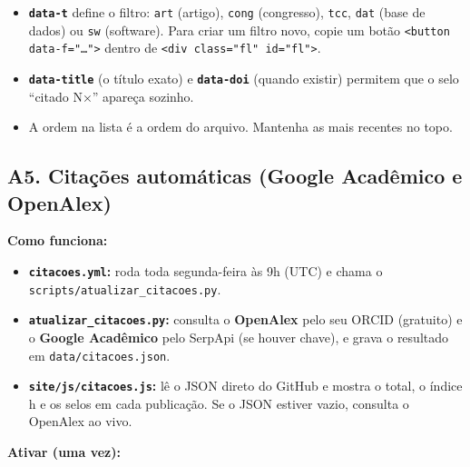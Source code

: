 \documentclass[
  10pt,
]{article}
\providecommand{\tightlist}{%
  \setlength{\itemsep}{0pt}\setlength{\parskip}{0pt}}
\begin{document}
\begin{itemize}
\tightlist
\item
  \textbf{\texttt{data-\allowbreak{}t}} define o filtro: \texttt{art}
  (artigo), \texttt{cong} (congresso), \texttt{tcc}, \texttt{dat} (base
  de dados) ou \texttt{sw} (software). Para criar um filtro novo, copie
  um botão \texttt{<button data-\allowbreak{}f="…">} dentro de
  \texttt{<div class="fl" id="fl">}.
\item
  \textbf{\texttt{data-\allowbreak{}title}} (o título exato) e
  \textbf{\texttt{data-\allowbreak{}doi}} (quando existir) permitem que
  o selo ``citado N×'' apareça sozinho.
\item
  A ordem na lista é a ordem do arquivo. Mantenha as mais recentes no
  topo.
\end{itemize}

\hypertarget{a5.-citauxe7uxf5es-automuxe1ticas-google-acaduxeamico-e-openalex}{%
\subsection{A5. Citações automáticas (Google Acadêmico e
OpenAlex)}\label{a5.-citauxe7uxf5es-automuxe1ticas-google-acaduxeamico-e-openalex}}

\textbf{Como funciona:}

\begin{itemize}
\tightlist
\item
  \textbf{\texttt{citacoes.\allowbreak{}yml}:} roda toda segunda-feira
  às 9h (UTC) e chama o
  \texttt{scripts/\allowbreak{}atualizar\_\allowbreak{}citacoes.\allowbreak{}py}.
\item
  \textbf{\texttt{atualizar\_\allowbreak{}citacoes.\allowbreak{}py}:}
  consulta o \textbf{OpenAlex} pelo seu ORCID (gratuito) e o
  \textbf{Google Acadêmico} pelo SerpApi (se houver chave), e grava o
  resultado em \texttt{data/\allowbreak{}citacoes.\allowbreak{}json}.
\item
  \textbf{\texttt{site/\allowbreak{}js/\allowbreak{}citacoes.\allowbreak{}js}:}
  lê o JSON direto do GitHub e mostra o total, o índice h e os selos em
  cada publicação. Se o JSON estiver vazio, consulta o OpenAlex ao vivo.
\end{itemize}

\textbf{Ativar (uma vez):}
\end{document}

